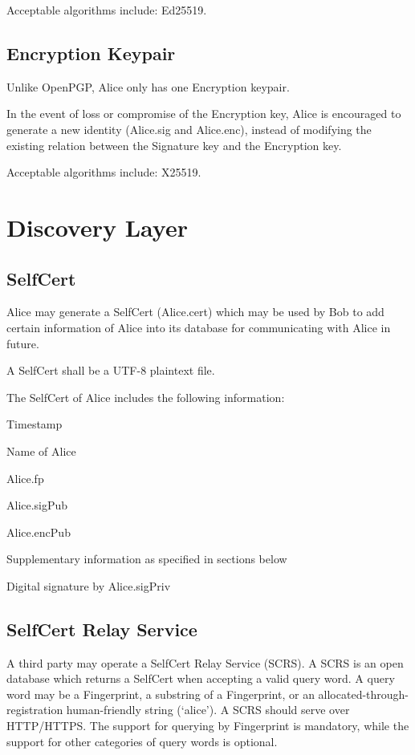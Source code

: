 \documentclass[a4paper,11pt]{article}
\begin{document}
Acceptable algorithms include: Ed25519.

\subsection{Encryption Keypair}
Unlike OpenPGP, Alice only has one Encryption keypair.

In the event of loss or compromise of the Encryption key,
Alice is encouraged to generate a new identity (Alice.sig and Alice.enc), instead of modifying the existing relation
between the Signature key and the Encryption key.

Acceptable algorithms include: X25519.






\section{Discovery Layer}

\subsection{SelfCert}
Alice may generate a SelfCert (Alice.cert) which may be used by Bob to add certain information of Alice
into its database for communicating with Alice in future.

A SelfCert shall be a UTF-8 plaintext file.

The SelfCert of Alice includes the following information:

\begin{compactitem}
	\item Timestamp
	\item Name of Alice
	\item Alice.fp
	\item Alice.sigPub
	\item Alice.encPub
	\item Supplementary information as specified in sections below
	\item Digital signature by Alice.sigPriv
\end{compactitem}

\subsection{SelfCert Relay Service}
A third party may operate a SelfCert Relay Service (SCRS).
A SCRS is an open database which returns a SelfCert when accepting a valid query word.
A query word may be a Fingerprint, a substring of a Fingerprint, or an allocated-through-registration human-friendly string (`alice').
A SCRS should serve over HTTP/HTTPS.
The support for querying by Fingerprint is mandatory, while the support for other categories of query words is optional.
\end{document}
